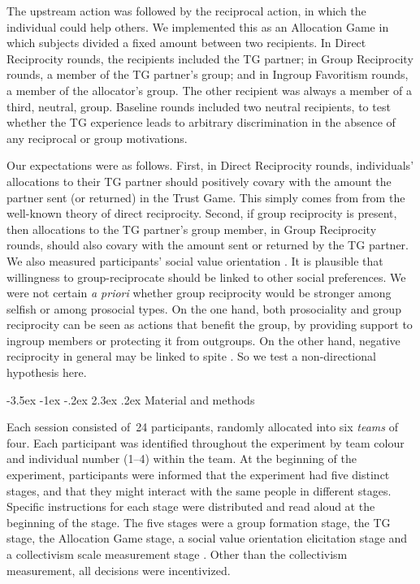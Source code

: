 \documentclass[12pt,a4paper]{article}\usepackage[]{graphicx}\usepackage[]{color}
\makeatletter
\renewcommand\section{\@startsection {section}{1}{\z@}%
{-3.5ex \@plus -1ex \@minus -.2ex}%
{2.3ex \@plus.2ex}%
{\bf\sffamily\Large}}
\makeatother
\begin{document}
The upstream action was followed by the reciprocal action,
in which the individual could help others. We implemented this as an Allocation
Game in which subjects divided a fixed amount between two recipients.
In Direct Reciprocity rounds, the recipients included the TG partner;
in Group Reciprocity rounds, a member of the TG partner's group; and
in Ingroup Favoritism rounds, a member of the allocator's group.
The other recipient was always a member of a third, neutral, group.
Baseline rounds included two neutral recipients, to test whether the
TG experience leads to arbitrary discrimination in the absence of any reciprocal
or group motivations.

Our expectations were as follows. First, in Direct Reciprocity rounds, individuals' allocations to their TG partner
should positively covary with the amount the partner sent (or returned) in the Trust Game. This simply comes from
from the well-known theory of direct reciprocity. Second, if group reciprocity is present, then allocations to the TG partner's group member, in Group Reciprocity rounds, should also covary with the amount sent or returned by the TG partner.
We also measured participants' social value orientation \citep{van1999pursuit}. It is plausible that willingness to group-reciprocate should
be linked to other social preferences. We were not certain \emph{a priori} whether group reciprocity would be stronger
among selfish or among prosocial types. On the one hand, both prosociality and group reciprocity can be seen as actions
that benefit the group, by providing support to ingroup members or protecting it from outgroups. On the other hand,
negative reciprocity in general may be linked to spite \citep{johnstone2004evolution}. So we test a non-directional hypothesis here.

\section{Material and methods}
\label{sec:design}

Each session consisted of~24 participants, randomly allocated into six
\emph{teams} of four. Each participant was identified throughout the experiment
by team colour and individual number (1--4) within the team. At the beginning of
the experiment, participants were informed that the experiment had five distinct
stages, and that they might interact with the same people in different stages.
Specific instructions for each stage were distributed and read aloud at the
beginning of the stage. The five stages were a group formation stage, the TG
stage, the Allocation Game stage, a social value orientation elicitation stage
\citep*{murphy2011measuring} and a collectivism scale measurement stage
\citep*[adapted from the horizontal collectivism scale
in][]{Singelis1995horizontal}. Other than the collectivism measurement, all decisions were incentivized.
\end{document}
